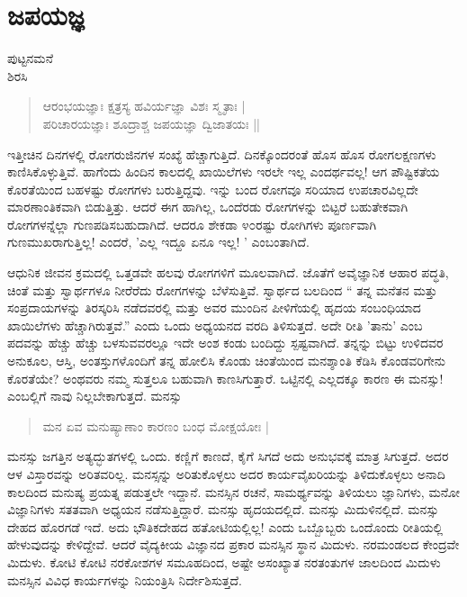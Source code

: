 \chapter{ಜಪಯಜ್ಞ}

\begin{center}
\smallskip

ಪುಟ್ಟನಮನೆ\\ 
ಶಿರಸಿ
\end{center}

\begin{verse}
ಆರಂಭಯಜ್ಞಾಃ ಕ್ಷತ್ರಸ್ಯ ಹವಿರ್ಯಜ್ಞಾ ವಿಶಃ ಸ್ಮೃತಾಃ |\\
ಪರಿಚಾರಯಜ್ಞಾಃ ಶೂದ್ರಾಶ್ಚ ಜಪಯಜ್ಞಾ ದ್ವಿಜಾತಯಃ ||
\end{verse}
ಇತ್ತೀಚಿನ ದಿನಗಳಲ್ಲಿ ರೋಗರುಜಿನಗಳ ಸಂಖ್ಯೆ ಹೆಚ್ಚಾಗುತ್ತಿದೆ. ದಿನಕ್ಕೊಂದರಂತೆ ಹೊಸ ಹೊಸ ರೋಗಲಕ್ಷಣಗಳು ಕಾಣಿಸಿಕೊಳ್ಳುತ್ತಿವೆ. ಹಾಗೆಂದು ಹಿಂದಿನ ಕಾಲದಲ್ಲಿ ಖಾಯಿಲೆಗಳು ಇರಲೇ ಇಲ್ಲ ಎಂದರ್ಥವಲ್ಲ! ಆಗ ಪೌಷ್ಟಿಕತೆಯ ಕೊರತೆಯಿಂದ ಬಹಳಷ್ಟು ರೋಗಗಳು ಬರುತ್ತಿದ್ದವು. ಇನ್ನು ಬಂದ ರೋಗವೂ ಸರಿಯಾದ ಉಪಚಾರವಿಲ್ಲದೇ ಮಾರಣಾಂತಿಕವಾಗಿ ಬಿಡುತ್ತಿತ್ತು. ಆದರೆ ಈಗ ಹಾಗಿಲ್ಲ, ಒಂದೆರಡು ರೋಗಗಳನ್ನು ಬಿಟ್ಟರೆ ಬಹುತೇಕವಾಗಿ ರೋಗಗಳನ್ನೆಲ್ಲಾ ಗುಣಪಡಿಸಬಹುದಾಗಿದೆ. ಆದರೂ ಶೇಕಡಾ ೪೦ರಷ್ಟು ರೋಗಿಗಳು ಪೂರ್ಣವಾಗಿ ಗುಣಮುಖರಾಗುತ್ತಿಲ್ಲ! ಎಂದರೆ, ’ಎಲ್ಲ ಇದ್ದೂ ಏನೂ ಇಲ್ಲ! ’ ಎಂಬಂತಾಗಿದೆ.

ಆಧುನಿಕ ಜೀವನ ಕ್ರಮದಲ್ಲಿ ಒತ್ತಡವೇ ಹಲವು ರೋಗಗಳಿಗೆ ಮೂಲವಾಗಿದೆ. ಜೊತೆಗೆ ಅವೈಜ್ಞಾನಿಕ ಆಹಾರ ಪದ್ಧತಿ, ಚಿಂತೆ ಮತ್ತು ಸ್ವಾರ್ಥಗಳೂ ನೀರೆರೆದು ರೋಗಗಳನ್ನು ಬೆಳೆಸುತ್ತಿವೆ. ಸ್ವಾರ್ಥದ ಬಲದಿಂದ “ ತನ್ನ ಮನೆತನ ಮತ್ತು ಸಂಪ್ರದಾಯಗಳನ್ನು ತಿರಸ್ಕರಿಸಿ ನಡೆದವರಲ್ಲಿ ಮತ್ತು ಅವರ ಮುಂದಿನ ಪೀಳಿಗೆಯಲ್ಲಿ ಹೃದಯ ಸಂಬಂಧಿಯಾದ ಖಾಯಿಲೆಗಳು ಹೆಚ್ಚಾಗಿರುತ್ತವೆ.” ಎಂದು ಒಂದು ಅಧ್ಯಯನದ ವರದಿ ತಿಳಿಸುತ್ತದೆ. ಅದೇ ರೀತಿ ’ತಾನು’ ಎಂಬ ಪದವನ್ನು ಹೆಚ್ಚು ಹೆಚ್ಚು ಬಳಸುವವರಲ್ಲೂ ಇದೇ ಅಂಶ ಕಂಡು ಬಂದಿದ್ದು ಸ್ಪಷ್ಟವಾಗಿದೆ. ತನ್ನನ್ನು ಬಿಟ್ಟು ಉಳಿದವರ ಅನುಕೂಲ, ಆಸ್ತಿ, ಅಂತಸ್ತುಗಳೊಂದಿಗೆ ತನ್ನ ಹೋಲಿಸಿ ಕೊಂಡು ಚಿಂತೆಯಿಂದ ಮನಶ್ಶಾಂತಿ ಕೆಡಿಸಿ ಕೊಂಡವರಿಗೇನು ಕೊರತೆಯೇ? ಅಂಥವರು ನಮ್ಮ ಸುತ್ತಲೂ ಬಹುವಾಗಿ ಕಾಣಸಿಗುತ್ತಾರೆ. ಒಟ್ಟಿನಲ್ಲಿ ಎಲ್ಲದಕ್ಕೂ ಕಾರಣ ಈ ಮನಸ್ಸು! ಎಂಬಲ್ಲಿಗೆ ನಾವು ನಿಲ್ಲಬೇಕಾಗುತ್ತದೆ. ಮನಸ್ಸು
\begin{verse}  
ಮನ ಏವ ಮನುಷ್ಯಾಣಾಂ ಕಾರಣಂ ಬಂಧ ಮೋಕ್ಷಯೋಃ |
\end{verse}
ಮನಸ್ಸು ಜಗತ್ತಿನ ಅತ್ಯದ್ಭುತಗಳಲ್ಲಿ ಒಂದು. ಕಣ್ಣಿಗೆ ಕಾಣದೆ, ಕೈಗೆ ಸಿಗದೆ ಅದು ಅನುಭವಕ್ಕೆ ಮಾತ್ರ ಸಿಗುತ್ತದೆ. ಅದರ ಆಳ ವಿಸ್ತಾರವನ್ನು ಅರಿತವರಿಲ್ಲ. ಮನಸ್ಸನ್ನು ಅರಿತುಕೊಳ್ಳಲು ಅದರ ಕಾರ್ಯವೈಖರಿಯನ್ನು ತಿಳಿದುಕೊಳ್ಳಲು ಅನಾದಿ ಕಾಲದಿಂದ ಮನುಷ್ಯ ಪ್ರಯತ್ನ ಪಡುತ್ತಲೇ ಇದ್ದಾನೆ. ಮನಸ್ಸಿನ ರಚನೆ, ಸಾಮರ್ಥ್ಯವನ್ನು ತಿಳಿಯಲು ಜ್ಞಾನಿಗಳು, ಮನೋ ವಿಜ್ಞಾನಿಗಳು ಸತತವಾಗಿ ಅಧ್ಯಯನ ನಡೆಸುತ್ತಿದ್ದಾರೆ. ಮನಸ್ಸು ಹೃದಯದಲ್ಲಿದೆ. ಮನಸ್ಸು ಮಿದುಳಿನಲ್ಲಿದೆ. ಮನಸ್ಸು ದೇಹದ ಹೊರಗಡೆ ಇದೆ. ಅದು ಭೌತಿಕದೇಹದ ಹತೋಟಿಯಲ್ಲಿಲ್ಲ! ಎಂದು ಒಬ್ಬೊಬ್ಬರು ಒಂದೊಂದು ರೀತಿಯಲ್ಲಿ ಹೇಳುವುದನ್ನು ಕೇಳಿದ್ದೇವೆ. ಆದರೆ ವೈದ್ಯಕೀಯ ವಿಜ್ಞಾನದ ಪ್ರಕಾರ ಮನಸ್ಸಿನ ಸ್ಥಾನ ಮಿದುಳು. ನರಮಂಡಲದ ಕೇಂದ್ರವೇ ಮಿದುಳು. ಕೋಟಿ ಕೋಟಿ ನರಕೋಶಗಳ ಸಮೂಹದಿಂದ, ಅಷ್ಟೇ ಅಸಂಖ್ಯಾತ ನರತಂತುಗಳ ಜಾಲದಿಂದ ಮಿದುಳು ಮನಸ್ಸಿನ ವಿವಿಧ ಕಾರ್ಯಗಳನ್ನು ನಿಯಂತ್ರಿಸಿ ನಿರ್ದೇಶಿಸುತ್ತದೆ.

